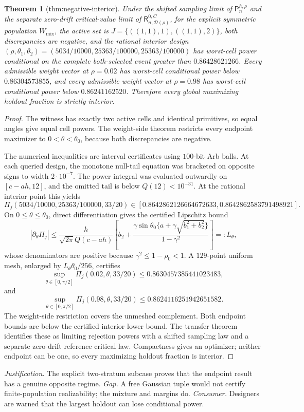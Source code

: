 \documentclass{article}
\newtheorem{theorem}{Theorem}
\begin{document}
\begin{theorem}[thm:negative-interior]\label{thm:negative-interior}
Under the shifted sampling limit of \(\mathsf P_n^{h,\rho}\) and the separate zero-drift critical-value limit of \(\mathsf R_{n,\mathcal D(\rho)}^{0,C}\), for the explicit symmetric population \(W_{\mathrm{mix}}\), the active set is \(J=\{((1,1),1),((1,1),2)\}\), both discrepancies are negative, and the rational interior design \( (\rho,\theta_1,\theta_2)=(5034/10000,25363/100000,25363/100000)\) has worst-cell power conditional on the complete both-selected event greater than \(0.86428621266\). Every admissible weight vector at \(\rho=0.02\) has worst-cell conditional power below \(0.86304573855\), and every admissible weight vector at \(\rho=0.98\) has worst-cell conditional power below \(0.86241162520\). Therefore every global maximizing holdout fraction is strictly interior.
\end{theorem}
\begin{proof}
The witness has exactly two active cells and identical primitives, so equal angles give equal cell powers.  The weight-side theorem restricts every endpoint maximizer to \(0<\theta<\theta_0\), because both discrepancies are negative.

The numerical inequalities are interval certificates using \(100\)-bit Arb balls.  At each queried design, the monotone null-tail equation was bracketed on opposite signs to width \(2\cdot10^{-7}\).  The power integral was evaluated outwardly on \([c-ah,12]\), and the omitted tail is below \(Q(12)<10^{-31}\).  At the rational interior point this yields
\[
\Pi_j(5034/10000,25363/100000,33/20)
\in[0.8642862126664672633,0.8642862583791498921].
\]
On \(0\le\theta\le\theta_0\), direct differentiation gives the certified Lipschitz bound
\[
|\partial_\theta\Pi_j|
\le\frac{h}{\sqrt{2\pi}Q(c-ah)}
\left[b_2+
\frac{\gamma\sin\theta_0\{a+\gamma\sqrt{b_1^2+b_2^2}\}}
{1-\gamma^2}\right]=:L_\theta,
\]
whose denominators are positive because \(\gamma^2\le1-\rho_0<1\).  A \(129\)-point uniform mesh, enlarged by \(L_\theta\theta_0/256\), certifies
\[
\sup_{\theta\in[0,\pi/2]}\Pi_j(0.02,\theta,33/20)
\le0.8630457385441023483,
\]
and
\[
\sup_{\theta\in[0,\pi/2]}\Pi_j(0.98,\theta,33/20)
\le0.8624116251942651582.
\]
The weight-side restriction covers the unmeshed complement.  Both endpoint bounds are below the certified interior lower bound.  The transfer theorem identifies these as limiting rejection powers with a shifted sampling law and a separate zero-drift reference critical law.  Compactness gives an optimizer; neither endpoint can be one, so every maximizing holdout fraction is interior.
\end{proof}
\par\smallskip\noindent \textit{Justification.} The explicit two-stratum subcase proves that the endpoint result has a genuine opposite regime. \textit{Gap.} A free Gaussian tuple would not certify finite-population realizability; the mixture and margins do. \textit{Consumer.} Designers are warned that the largest holdout can lose conditional power.
\end{document}
